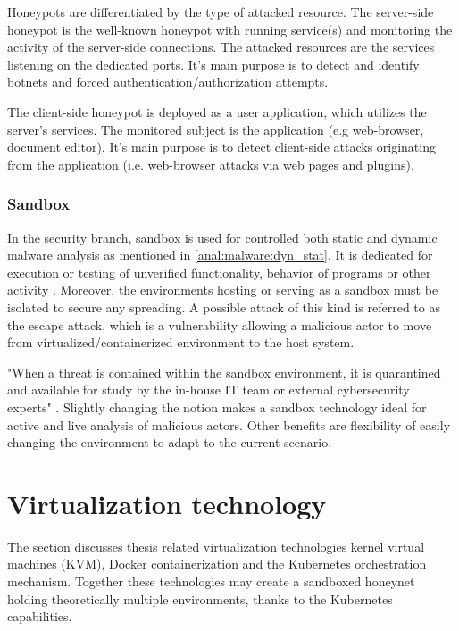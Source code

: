 Honeypots are differentiated by the type of attacked resource. The server-side honeypot is the well-known honeypot with running service(s) and monitoring the activity of the server-side connections. The attacked resources are the services listening on the dedicated ports. It's main purpose is to detect and identify botnets and forced authentication/authorization attempts.

The client-side honeypot is deployed as a user application, which utilizes the server's services. The monitored subject is the application (e.g web-browser, document editor). It's main purpose is to detect client-side attacks originating from the application (i.e. web-browser attacks via web pages and plugins).


\subsubsection*{Sandbox \label{anal:malware:mech_envs:sand}}
In the security branch, sandbox is used for controlled both static and dynamic malware analysis as mentioned in \autoref{anal:malware:dyn_stat}. It is dedicated for execution or testing of unverified functionality, behavior of programs or other activity \cite{article:fortinet:sandbox}. Moreover, the environments hosting or serving as a sandbox must be isolated to secure any spreading. A possible attack of this kind is referred to as the escape attack, which is a vulnerability allowing a malicious actor to move from virtualized/containerized environment to the host system.

"When a threat is contained within the sandbox environment, it is quarantined and available for study by the in-house IT team or external cybersecurity experts" \cite{article:fortinet:sandbox}. Slightly changing the notion makes a sandbox technology ideal for active and live analysis of malicious actors. Other benefits are flexibility of easily changing the environment to adapt to the current scenario.

\section{Virtualization technology \label{anal:virtual}}
The section discusses thesis related virtualization technologies kernel virtual machines (KVM), Docker containerization and the Kubernetes orchestration mechanism. Together these technologies may create a sandboxed honeynet holding theoretically multiple environments, thanks to the Kubernetes capabilities.

